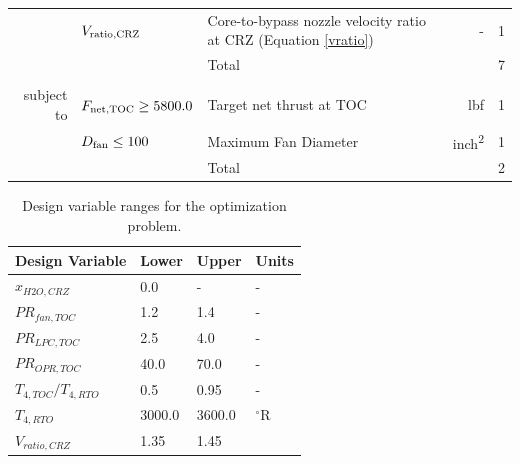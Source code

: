 \documentclass[conf]{new-aiaa}
\begin{document}
\begin{table}[hbt!]
\begin{tabular}{r l l r l}
                        & $V_{\rm{ratio,CRZ}}$           & Core-to-bypass nozzle velocity ratio at CRZ (Equation \eqref{vratio}) & -              & 1        \\
        \cline{3-5}
                        &                                & Total                                                                 &                & 7        \\
                        &                                &                                                                       &                &          \\
        subject to      & $F_{\rm{net,TOC}} \geq 5800.0$ & Target net thrust at TOC                                              & \si{lbf}       & 1        \\
                        & $D_{\rm{fan}} \leq 100$        & Maximum Fan Diameter                                                  & \si{inch^2}    & 1        \\
        \cline{3-5}
                        &                                & Total                                                                 &                & 2        \\
        \bottomrule
    \end{tabular}
    \label{tab:opt_problem}
\end{table}

\begin{table}[hbt!]
    \centering
    \caption{Design variable ranges for the optimization problem.
    }
    \small
    \renewcommand{\arraystretch}{1.2}
    \begin{tabular}{l l l l}
        Design Variable       & Lower  & Upper  & Units     \\
        \toprule
        $x_{H2O,CRZ}$         & 0.0    & -      & -         \\
        $PR_{fan,TOC}$        & 1.2    & 1.4    & -         \\
        $PR_{LPC,TOC}$        & 2.5    & 4.0    & -         \\
        $PR_{OPR,TOC}$        & 40.0   & 70.0   & -         \\
        $T_{4,TOC}/T_{4,RTO}$ & 0.5    & 0.95   & -         \\
        $T_{4,RTO}$           & 3000.0 & 3600.0 & $^\circ$R \\
        $V_{ratio,CRZ}$       & 1.35   & 1.45   &           \\
        \bottomrule
    \end{tabular}
    \label{tab:res_full_opt_H2}
\end{table}
\end{document}
